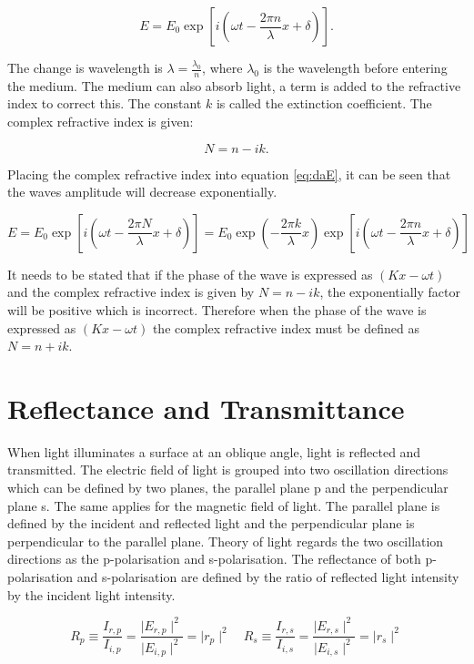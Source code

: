 \documentclass[MasterThesisMain.tex]{subfiles}
\begin{document}
\begin{equation}
E = E_0\exp[i(\omega t - \frac{2\pi n}{\lambda}x + \delta)]\label{eq:daE}.
\end{equation}

The change is wavelength is $\lambda = \frac{\lambda_0}{n}$, where $\lambda_0$ is the wavelength before entering the medium. The medium can also absorb light, a term is added to the refractive index to correct this. The constant $k$ is called the extinction coefficient. The complex refractive index is given:

\begin{equation}
N=n-ik.
\end{equation}

Placing the complex refractive index into equation \ref{eq:daE}, it can be seen that the waves amplitude will decrease exponentially.

\begin{equation}
E = E_0\exp[i(\omega t - \frac{2\pi N}{\lambda}x + \delta)] = E_0\exp(-\frac{2\pi k}{\lambda}x)\exp[i(\omega t - \frac{2\pi n}{\lambda}x + \delta)]
\end{equation}

It needs to be stated that if the phase of the wave is expressed as $(Kx-\omega t)$ and the complex refractive index is given by $N=n-ik$, the exponentially factor will be positive which is incorrect. Therefore when the phase of the wave is expressed as $(Kx-\omega t)$ the complex refractive index must be defined as $N=n+ik$.

\section{Reflectance and Transmittance}\label{ch:reflect/trans}
When light illuminates a surface at an oblique angle, light is reflected and transmitted. The electric field of light is grouped into two oscillation directions which can be defined by two planes, the parallel plane p and the perpendicular plane s. The same applies for the magnetic field of light. The parallel plane is defined by the incident and reflected light and the perpendicular plane is perpendicular to the parallel plane. Theory of light regards the two oscillation directions as the p-polarisation and s-polarisation. The reflectance of both p-polarisation and s-polarisation are defined by the ratio of reflected light intensity by the incident light intensity.

\begin{equation}
R_{p} \equiv \frac{I_{r,p}}{I_{i,p}} = \frac{\mid E_{r,p} \mid^2}{\mid E_{i,p} \mid^2} = \mid r_{p} \mid^2 \quad R_{s} \equiv \frac{I_{r,s}}{I_{i,s}} = \frac{\mid E_{r,s} \mid^2}{\mid E_{i,s} \mid^2} = \mid r_{s} \mid^2
\end{equation}
\end{document}
